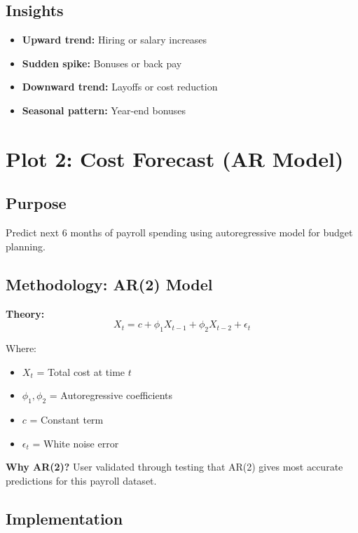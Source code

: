 \subsection{Insights}

\begin{itemize}
    \item \textbf{Upward trend:} Hiring or salary increases
    \item \textbf{Sudden spike:} Bonuses or back pay
    \item \textbf{Downward trend:} Layoffs or cost reduction
    \item \textbf{Seasonal pattern:} Year-end bonuses
\end{itemize}

\section{Plot 2: Cost Forecast (AR Model)}

\subsection{Purpose}
Predict next 6 months of payroll spending using autoregressive model for budget planning.

\subsection{Methodology: AR(2) Model}

\textbf{Theory:}
$$X_t = c + \phi_1 X_{t-1} + \phi_2 X_{t-2} + \epsilon_t$$

Where:
\begin{itemize}
    \item $X_t$ = Total cost at time $t$
    \item $\phi_1, \phi_2$ = Autoregressive coefficients
    \item $c$ = Constant term
    \item $\epsilon_t$ = White noise error
\end{itemize}

\textbf{Why AR(2)?} User validated through testing that AR(2) gives most accurate predictions for this payroll dataset.

\subsection{Implementation}

